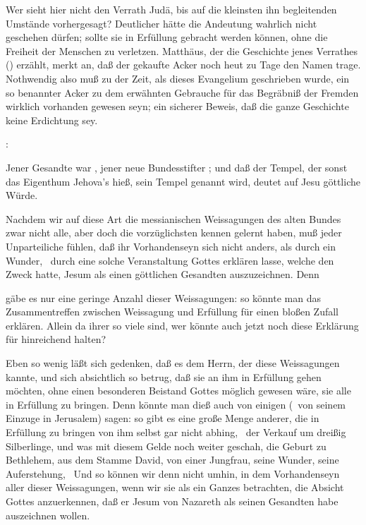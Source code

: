 Wer sieht hier nicht den Verrath Judä, bis auf die kleinsten ihn begleitenden Umstände vorhergesagt? Deutlicher hätte die Andeutung wahrlich nicht geschehen dürfen; sollte sie in Erfüllung gebracht werden können, ohne die Freiheit der Menschen zu verletzen. Matthäus, der die Geschichte jenes Verrathes () erzählt, merkt an, daß der gekaufte Acker noch heut zu Tage den Namen  trage. Nothwendig also muß zu der Zeit, als dieses Evangelium geschrieben wurde, ein so benannter Acker zu dem erwähnten Gebrauche für das Begräbniß der Fremden wirklich vorhanden gewesen seyn; ein sicherer Beweis, daß die ganze Geschichte keine Erdichtung sey.
\begin{aufza}\setcounter{enumi}{7}
\item {}: 
\end{aufza}\par
Jener Gesandte war , jener neue Bundesstifter ; und daß der Tempel, der sonst das Eigenthum Jehova's hieß, sein Tempel genannt wird, deutet auf Jesu göttliche Würde.~


Nachdem wir auf diese Art die messianischen Weissagungen des alten Bundes zwar nicht alle, aber doch die vorzüglichsten kennen gelernt haben, muß jeder Unparteiliche fühlen, daß ihr Vorhandenseyn sich nicht anders, als durch ein Wunder, \dh\ durch eine solche Veranstaltung Gottes erklären lasse, welche den Zweck hatte, Jesum als einen göttlichen Gesandten auszuzeichnen. Denn
\begin{aufza}
\item gäbe es nur eine geringe Anzahl dieser Weissagungen: so könnte man das Zusammentreffen zwischen Weissagung und Erfüllung für einen bloßen Zufall erklären. Allein da ihrer so viele sind, wer könnte auch jetzt noch diese Erklärung für hinreichend halten?
\item Eben so wenig läßt sich gedenken, daß es dem Herrn, der diese Weissagungen kannte, und sich absichtlich so betrug, daß sie an ihm in Erfüllung gehen möchten, ohne einen besonderen Beistand Gottes möglich gewesen wäre, sie alle in Erfüllung zu bringen. Denn könnte man dieß auch von einigen (\zB\ von seinem Einzuge in Jerusalem) sagen: so gibt es eine große Menge anderer, die in Erfüllung zu bringen von ihm selbst gar nicht abhing, \zB\ der Verkauf um dreißig Silberlinge, und was mit diesem Gelde noch weiter geschah, die Geburt zu Bethlehem, aus dem Stamme David, von einer Jungfrau, seine Wunder, seine Auferstehung, \usw\ Und so können wir denn nicht umhin, in dem Vorhandenseyn aller dieser Weissagungen, wenn wir sie als ein Ganzes betrachten, die Absicht Gottes anzuerkennen, daß er Jesum von Nazareth als seinen Gesandten habe auszeichnen wollen.
\end{aufza}

